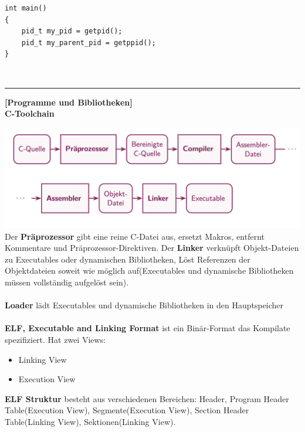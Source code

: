 \documentclass[8pt]{extarticle}
\let\oldtextbf\textbf
\renewcommand{\textbf}{\tiny\oldtextbf}
\begin{document}
\begin{multicols*}{5}
\begin{lstlisting}
int main()
{
    pid_t my_pid = getpid();
    pid_t my_parent_pid = getppid();
}
	\end{lstlisting}\
			
	\rule{\linewidth}{0.4pt}
	\textbf{[Programme und Bibliotheken]}\\
	\textbf{C-Toolchain}
		
	\includegraphics[scale=0.255]{C-Toolchain.png}
	Der \textbf{Präprozessor} gibt eine reine C-Datei aus, ersetzt Makros, entfernt Kommentare und Präprozessor-Direktiven. Der \textbf{Linker} verknüpft Objekt-Dateien zu Executables oder dynamischen Bibliotheken, Löst Referenzen der Objektdateien soweit wie möglich auf(Executables und dynamische Bibliotheken müssen vollständig aufgelöst sein).\\\\
	\textbf{Loader} lädt Executables und dynamische Bibliotheken in den Hauptspeicher\\\\
	\textbf{ELF, Executable and Linking Format} ist ein Binär-Format das Kompilate spezifiziert. Hat zwei Views:
	\begin{itemize} [noitemsep, topsep=0pt, leftmargin=*]
		\item Linking View
		\item Execution View
	\end{itemize}
	\vspace{5pt}
	\textbf{ELF Struktur} besteht aus verschiedenen Bereichen: Header, Program Header Table(Execution View), Segmente(Execution View), Section Header Table(Linking View), Sektionen(Linking View).
			

\end{multicols*}
\end{document}

